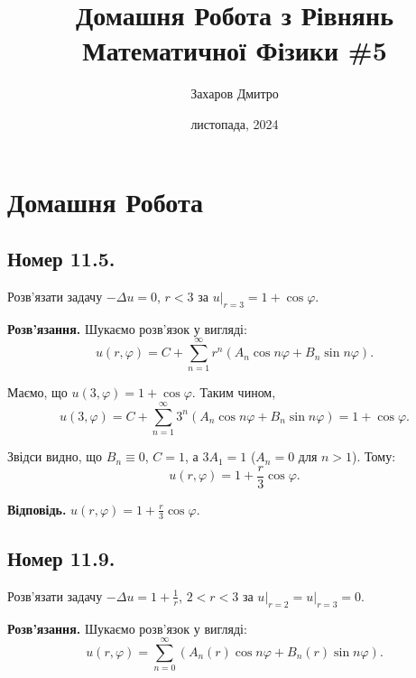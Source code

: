 \documentclass{hw_template}
\title{\huge\sffamily\bfseries Домашня Робота з Рівнянь Математичної Фізики \#5}
\author{\Large\sffamily Захаров Дмитро}
\date{\sffamily 23 листопада, 2024}
\begin{document}
\pagestyle{fancy}

\maketitle

\tableofcontents

\pagebreak

\section{Домашня Робота}

\subsection{Номер 11.5.}

\begin{problem}
    Розв'язати задачу $-\Delta u = 0$, $r<3$ за $u\Big|_{r=3}=1+\cos\varphi$.
\end{problem}

\textbf{Розв'язання.} Шукаємо розв'язок у вигляді:
\begin{equation*}
    u(r,\varphi) = C + \sum_{n=1}^{\infty}r^n(A_n\cos n\varphi + B_n \sin n\varphi).
\end{equation*}

Маємо, що $u(3,\varphi) = 1+\cos\varphi$. Таким чином,
\begin{equation*}
    u(3,\varphi) = C+\sum_{n=1}^{\infty}3^n(A_n\cos n\varphi + B_n \sin n\varphi) = 1+\cos\varphi.
\end{equation*}

Звідси видно, що $B_n \equiv 0$, $C=1$, а $3A_1=1$ ($A_n=0$ для $n>1$). Тому:
\begin{equation*}
    u(r,\varphi) = 1 + \frac{r}{3}\cos\varphi.
\end{equation*}

\textbf{Відповідь.} $u(r,\varphi) = 1 + \frac{r}{3}\cos\varphi$.

\newpage

\subsection{Номер 11.9.}

\begin{problem}
    Розв'язати задачу $-\Delta u = 1+\frac{1}{r}$, $2<r<3$ за $u\Big|_{r=2}=u\Big|_{r=3}=0$.
\end{problem}

\textbf{Розв'язання.} Шукаємо розв'язок у вигляді:
\begin{equation*}
    u(r,\varphi) = \sum_{n=0}^{\infty}(A_n(r)\cos n\varphi + B_n(r)\sin n\varphi).
\end{equation*}
\end{document}
